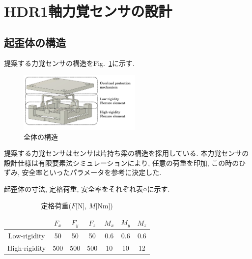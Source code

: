 \section{HDR1軸力覚センサの設計}
\subsection{起歪体の構造}
提案する力覚センサの構造をFig.~\ref{fig:sensor}に示す. 

\begin{figure}[b]
  \begin{center}
    \includegraphics[width=6.0cm]{pic/sensor.png}
    \caption{全体の構造}\label{fig:sensor}
  \end{center}
\end{figure}

提案する力覚センサはセンサは片持ち梁の構造を採用している. 
本力覚センサの設計仕様は有限要素法シミュレーションにより, 
任意の荷重を印加, この時のひずみ, 安全率といったパラメータを参考に決定した.

起歪体の寸法, 定格荷重, 安全率をそれぞれ表○に示す. 
\begin{table}[h]
  \caption{定格荷重($F$[N], $M$[Nm])}\label{tb:kajuu}
  \begin{center}
   \begin{tabular}{ c c c c c c c }
    \hline
     & $F_x$ & $F_y$ & $F_z$ & $M_x$ & $M_y$ & $M_z$  \\
    \hline
    Low-rigidity & 50 & 50 & 50 & 0.6 & 0.6 & 0.6  \\
    \hline
    High-rigidity & 500 & 500 & 500 & 10 & 10 & 12  \\
    \hline   
   \end{tabular}
  \end{center}
 \end{table}

